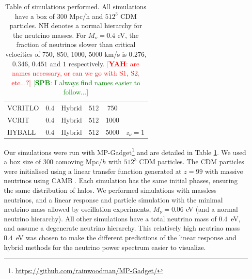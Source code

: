 \documentclass[useAMS, usenatbib]{mnras}
\newcommand{\spb}[1]{{\textcolor{green}{[{\bf SPB}: #1]}}}
\newcommand{\yah}[1]{{\textcolor{red}{[{\bf YAH}: #1]}}}
\begin{document}
\begin{table}
\begin{center}
\begin{tabular}{|l|c|c|c|c|l|}
VCRITLO    &     0.4             &   Hybrid      & 512       & 750 & \\
VCRIT    &     0.4             &   Hybrid      & 512       & 1000 & \\
HYBALL    &     0.4             &   Hybrid      & 512       & 5000 & $z_\nu = 1$ \\
\hline
\end{tabular}
\end{center}
\caption{Table of simulations performed. All simulations have a box of $300$ Mpc/h
and $512^3$ CDM particles. NH denotes a normal hierarchy for the neutrino masses.
For $M_\nu = 0.4$ eV, the fraction of neutrinos slower than critical velocities of $750$, $850$, $1000$, $5000$ km/s is $0.276$, $0.346$, $0.451$ and $1$ respectively. \yah{are names necessary, or can we go with S1, S2, etc...?} \spb{I always find names easier to follow...}}
\label{tab:simulations}
\end{table}


%

Our simulations were run with MP-Gadget\footnote{\url{https://github.com/rainwoodman/MP-Gadget/}} and are detailed in Table \ref{tab:simulations}. We used a box size of $300$ comoving Mpc/$h$ with $512^3$ CDM particles.
The CDM particles were initialised using a linear transfer function generated at $z=99$ with massive neutrinos using CAMB \citep{CAMB_neutrinos}. Each simulation has the same initial phases, ensuring the same distribution of halos. We performed simulations with massless neutrinos, and a linear response and particle simulation with the minimal neutrino mass allowed by oscillation experiments, $M_\nu = 0.06$ eV (and a normal neutrino hierarchy). All other simulations have a total neutrino mass of $0.4$~eV, and assume a degenerate neutrino hierarchy. This relatively high neutrino mass $0.4$~eV was chosen to make the different predictions of the linear response and hybrid methods for the neutrino power spectrum easier to visualize.
\end{document}
